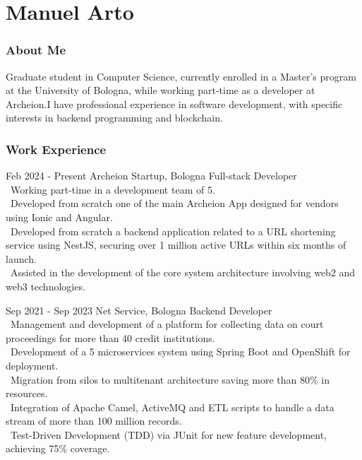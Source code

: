 \documentclass{tccv}
\begin{document}
\part{Manuel Arto}

\section{About Me}

Graduate student in Computer Science, currently enrolled in a Master's program at the University of Bologna, while working part-time as a developer at Archeion.\newline I have professional experience in software development, with specific interests in backend programming and blockchain.

\section{Work Experience}

\begin{eventlist}

     \item{Feb 2024 - Present}
     {Archeion Startup, Bologna}
     {Full-stack Developer} \\
     \textbullet~Working part-time in a development team of 5. \\
     \textbullet~Developed from scratch one of the main Archeion App designed for vendors using Ionic and Angular. \\
     \textbullet~Developed from scratch a backend application related to a URL shortening service using NestJS, securing over 1 million active URLs within six months of launch. \\
     \textbullet~Assisted in the development of the core system architecture involving web2 and web3 technologies.

     \item{Sep 2021 - Sep 2023}
     {Net Service, Bologna}
     {Backend Developer} \\
     \textbullet~Management and development of a platform for collecting data on court proceedings for more than 40 credit institutions. \\
     \textbullet~Development of a 5 microservices system using Spring Boot and OpenShift for deployment. \\
     \textbullet~Migration from silos to multitenant architecture saving more than 80\% in resources. \\
     \textbullet~Integration of Apache Camel, ActiveMQ and ETL scripts to handle a data stream of more than 100 million records. \\
     \textbullet~Test-Driven Development (TDD) via JUnit for new feature development, achieving 75\% coverage.

\end{eventlist}
\end{document}
